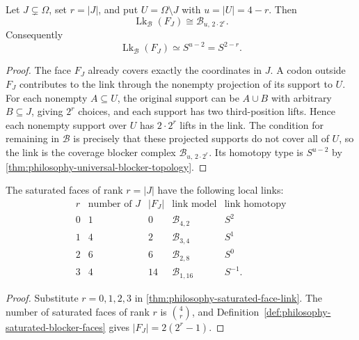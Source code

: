 \begin{theorem}
\label{thm:philosophy-saturated-face-link}
Let $J\subsetneq\Omega$, set $r=|J|$, and put
$U=\Omega\setminus J$ with $u=|U|=4-r$. Then
$$
  \operatorname{Lk}_{\mathcal{B}}(F_{J})
  \cong
  \mathcal{B}_{u,\,2\cdot2^{r}}.
$$
Consequently
$$
  \operatorname{Lk}_{\mathcal{B}}(F_{J})
  \simeq
  S^{u-2}
  =
  S^{2-r}.
$$
\end{theorem}
\begin{proof}
The face $F_{J}$ already covers exactly the coordinates in $J$. A
codon outside $F_{J}$ contributes to the link through the nonempty
projection of its support to $U$. For each nonempty $A\subseteq U$, the
original support can be $A\cup B$ with arbitrary $B\subseteq J$, giving
$2^{r}$ choices, and each support has two third-position lifts. Hence
each nonempty support over $U$ has $2\cdot2^{r}$ lifts in the link. The
condition for remaining in $\mathcal{B}$ is precisely that these
projected supports do not cover all of $U$, so the link is the
coverage blocker complex $\mathcal{B}_{u,\,2\cdot2^{r}}$. Its homotopy
type is $S^{u-2}$ by
\autoref{thm:philosophy-universal-blocker-topology}.
\end{proof}

\begin{corollary}
\label{cor:philosophy-codon-local-sphere-strata}
The saturated faces of rank $r=|J|$ have the following local links:
$$
\begin{array}{c|r|r|r|c}
  r & \text{number of }J & |F_{J}| & \text{link model} & \text{link homotopy}\\
  \hline
  0 & 1 & 0 & \mathcal{B}_{4,2} & S^{2}\\
  1 & 4 & 2 & \mathcal{B}_{3,4} & S^{1}\\
  2 & 6 & 6 & \mathcal{B}_{2,8} & S^{0}\\
  3 & 4 & 14 & \mathcal{B}_{1,16} & S^{-1}.
\end{array}
$$
\end{corollary}
\begin{proof}
Substitute $r=0,1,2,3$ in
\autoref{thm:philosophy-saturated-face-link}. The number of saturated
faces of rank $r$ is $\binom{4}{r}$, and
Definition~\ref{def:philosophy-saturated-blocker-faces} gives
$|F_{J}|=2(2^{r}-1)$.
\end{proof}

